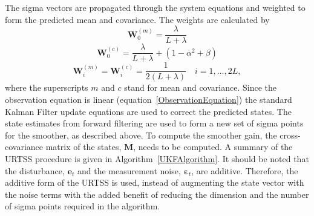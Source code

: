\documentclass[10pt,a4paper]{article}
\begin{document}
The sigma vectors are propagated through the system equations and weighted to form the predicted mean and covariance. The weights are calculated by 
\begin{equation}
	\mathbf W_0^{(m)}=\frac{\lambda}{ L+\lambda} 
\end{equation}
\begin{equation}
	\mathbf W_0^{(c)}=\frac{\lambda}{ L+\lambda}+(1-\alpha^2+\beta) 
\end{equation}
\begin{equation}
	\mathbf W_i^{(m)}=\mathbf W_i^{(c)}=\frac{1}{2( L+\lambda)} \quad i=1, \dots, 2L, 
\end{equation}
where the superscripts $m$ and $c$ stand for mean and covariance. Since the observation equation is linear (equation~\ref{ObservationEquation}) the standard Kalman Filter update equations are used to correct the predicted states. The state estimates from forward filtering are used to form a new set of sigma points for the smoother, as described above. To compute the smoother gain, the cross-covariance matrix of the states, $\mathbf M$, needs to be computed. A summary of the URTSS procedure is given in Algorithm~\ref{UKFAlgorithm}. It should be noted that the disturbance, $\mathbf{e}_t$ and the measurement noise, $\boldsymbol{\varepsilon}_t$, are additive. Therefore, the additive form of the URTSS is used, instead of augmenting the state vector with the noise terms with the added benefit of reducing the dimension and the number of sigma points required in the algorithm.
\end{document}

